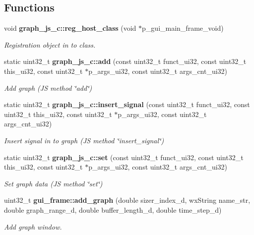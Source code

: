\subsection*{Functions}
\begin{DoxyCompactItemize}
\item 
void \textbf{ graph\+\_\+js\+\_\+c\+::reg\+\_\+host\+\_\+class} (void $\ast$p\+\_\+gui\+\_\+main\+\_\+frame\+\_\+void)
\begin{DoxyCompactList}\small\item\em Registration object in to class. \end{DoxyCompactList}\item 
static uint32\+\_\+t \textbf{ graph\+\_\+js\+\_\+c\+::add} (const uint32\+\_\+t funct\+\_\+ui32, const uint32\+\_\+t this\+\_\+ui32, const uint32\+\_\+t $\ast$p\+\_\+args\+\_\+ui32, const uint32\+\_\+t args\+\_\+cnt\+\_\+ui32)
\begin{DoxyCompactList}\small\item\em Add graph (JS method \char`\"{}add\char`\"{}) \end{DoxyCompactList}\item 
static uint32\+\_\+t \textbf{ graph\+\_\+js\+\_\+c\+::insert\+\_\+signal} (const uint32\+\_\+t funct\+\_\+ui32, const uint32\+\_\+t this\+\_\+ui32, const uint32\+\_\+t $\ast$p\+\_\+args\+\_\+ui32, const uint32\+\_\+t args\+\_\+cnt\+\_\+ui32)
\begin{DoxyCompactList}\small\item\em Insert signal in to graph (JS method \char`\"{}insert\+\_\+signal\char`\"{}) \end{DoxyCompactList}\item 
static uint32\+\_\+t \textbf{ graph\+\_\+js\+\_\+c\+::set} (const uint32\+\_\+t funct\+\_\+ui32, const uint32\+\_\+t this\+\_\+ui32, const uint32\+\_\+t $\ast$p\+\_\+args\+\_\+ui32, const uint32\+\_\+t args\+\_\+cnt\+\_\+ui32)
\begin{DoxyCompactList}\small\item\em Set graph data (JS method \char`\"{}set\char`\"{}) \end{DoxyCompactList}\item 
uint32\+\_\+t \textbf{ gui\+\_\+frame\+::add\+\_\+graph} (double sizer\+\_\+index\+\_\+d, wx\+String name\+\_\+str, double graph\+\_\+range\+\_\+d, double buffer\+\_\+length\+\_\+d, double time\+\_\+step\+\_\+d)
\begin{DoxyCompactList}\small\item\em Add graph window. \end{DoxyCompactList}\item 

\end{DoxyCompactItemize}
